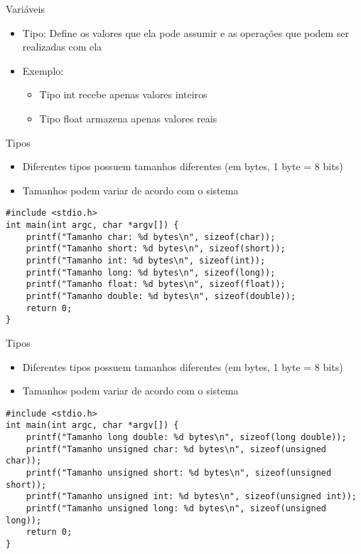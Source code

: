 \documentclass[t, aspectratio=169]{beamer}
\begin{document}
\begin{frame}[label={sec:org717c00d}]{Variáveis}
\begin{itemize}
\item Tipo: Define os valores que ela pode assumir e as operações que podem ser
realizadas com ela

\item Exemplo:
\begin{itemize}
\item Tipo \alert{int} recebe apenas valores inteiros
\item Tipo \alert{float} armazena apenas valores reais
\end{itemize}
\end{itemize}
\end{frame}

\begin{frame}[label={sec:orga00f677},fragile]{Tipos}
 \begin{itemize}
\item Diferentes tipos possuem tamanhos diferentes (em \alert{bytes}, 1 byte = 8 bits)
\item Tamanhos podem variar de acordo com o sistema
\end{itemize}

\begin{verbatim}
#include <stdio.h>
int main(int argc, char *argv[]) {
    printf("Tamanho char: %d bytes\n", sizeof(char));
    printf("Tamanho short: %d bytes\n", sizeof(short));
    printf("Tamanho int: %d bytes\n", sizeof(int));
    printf("Tamanho long: %d bytes\n", sizeof(long));
    printf("Tamanho float: %d bytes\n", sizeof(float));
    printf("Tamanho double: %d bytes\n", sizeof(double));
    return 0;
}
\end{verbatim}
\end{frame}

\begin{frame}[label={sec:org1030d39},fragile]{Tipos}
 \begin{itemize}
\item Diferentes tipos possuem tamanhos diferentes (em \alert{bytes}, 1 byte = 8 bits)
\item Tamanhos podem variar de acordo com o sistema
\end{itemize}

\begin{verbatim}
#include <stdio.h>
int main(int argc, char *argv[]) {
    printf("Tamanho long double: %d bytes\n", sizeof(long double));
    printf("Tamanho unsigned char: %d bytes\n", sizeof(unsigned char));
    printf("Tamanho unsigned short: %d bytes\n", sizeof(unsigned short));
    printf("Tamanho unsigned int: %d bytes\n", sizeof(unsigned int));
    printf("Tamanho unsigned long: %d bytes\n", sizeof(unsigned long));
    return 0;
}
\end{verbatim}
\end{frame}
\end{document}
